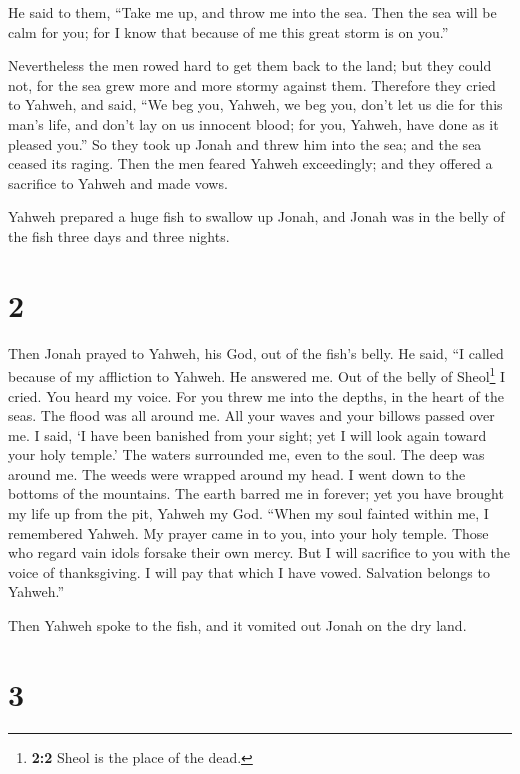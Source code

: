  He said to them, ``Take me up, and throw me into the
sea. Then the sea will be calm for you; for I know that because of me
this great storm is on you.''

 Nevertheless the men rowed hard to get them back to the
land; but they could not, for the sea grew more and more stormy against
them.  Therefore they cried to Yahweh, and said, ``We beg
you, Yahweh, we beg you, don't let us die for this man's life, and don't
lay on us innocent blood; for you, Yahweh, have done as it pleased
you.''  So they took up Jonah and threw him into the sea;
and the sea ceased its raging.  Then the men feared
Yahweh exceedingly; and they offered a sacrifice to Yahweh and made
vows.

 Yahweh prepared a huge fish to swallow up Jonah, and
Jonah was in the belly of the fish three days and three nights.

\hypertarget{section-1}{%
\section{2}\label{section-1}}

 Then Jonah prayed to Yahweh, his God, out of the fish's
belly.  He said, ``I called because of my affliction to
Yahweh. He answered me. Out of the belly of Sheol\footnote{\textbf{2:2}
  Sheol is the place of the dead.} I cried. You heard my voice.
 For you threw me into the depths, in the heart of the
seas. The flood was all around me. All your waves and your billows
passed over me.  I said, `I have been banished from your
sight; yet I will look again toward your holy temple.' 
The waters surrounded me, even to the soul. The deep was around me. The
weeds were wrapped around my head.  I went down to the
bottoms of the mountains. The earth barred me in forever; yet you have
brought my life up from the pit, Yahweh my God.  ``When my
soul fainted within me, I remembered Yahweh. My prayer came in to you,
into your holy temple.  Those who regard vain idols
forsake their own mercy.  But I will sacrifice to you with
the voice of thanksgiving. I will pay that which I have vowed. Salvation
belongs to Yahweh.''

 Then Yahweh spoke to the fish, and it vomited out Jonah
on the dry land.

\hypertarget{section-2}{%
\section{3}\label{section-2}}

